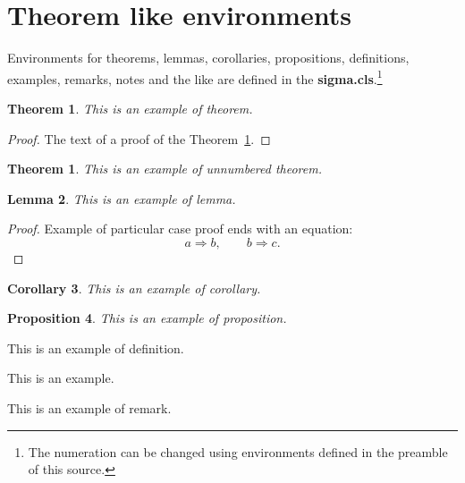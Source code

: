 \documentclass[pdftex]{sigma}
\numberwithin{equation}{section}
\newtheorem{Theorem}{Theorem}[section]
\newtheorem*{Theorem*}{Theorem}
\newtheorem{Corollary}[Theorem]{Corollary}
\newtheorem{Lemma}[Theorem]{Lemma}
\newtheorem{Proposition}[Theorem]{Proposition}
 { \theoremstyle{definition}
\newtheorem{Definition}[Theorem]{Definition}
\newtheorem{Note}[Theorem]{Note}
\newtheorem{Example}[Theorem]{Example}
\newtheorem{Remark}[Theorem]{Remark} }
\begin{document}
\section{Theorem like environments}

Environments for theorems, lemmas, corollaries, propositions, definitions,
examples, remarks, notes and the like are defined in the {\bf sigma.cls}.\footnote{The numeration can be changed using environments defined in the preamble of this source.}

\begin{Theorem}\label{theorem1}
This is an example of theorem.
\end{Theorem}

\begin{proof}
The text of a proof of the Theorem~\ref{theorem1}.
\end{proof}

\begin{Theorem*}
This is an example of unnumbered theorem.
\end{Theorem*}

\begin{Lemma}\label{lemma1}
This is an example of lemma.
\end{Lemma}

\begin{proof}
Example of particular case proof ends with an equation:
  \begin{equation*}
    a\Longrightarrow b, \qquad b \Longrightarrow c. \tag*{\qed}
  \end{equation*}
  \renewcommand{\qed}{}
\end{proof}


\begin{Corollary}\label{corollary1}
This is an example of corollary.
\end{Corollary}

\begin{Proposition}\label{proposition1}
This is an example of proposition.
\end{Proposition}

\begin{Definition}\label{definition1}
This is an example of definition.
\end{Definition}

\begin{Example}\label{example1}
This is an example.
\end{Example}

\begin{Remark}\label{remark1}
This is an example of remark.
\end{Remark}
\end{document}
